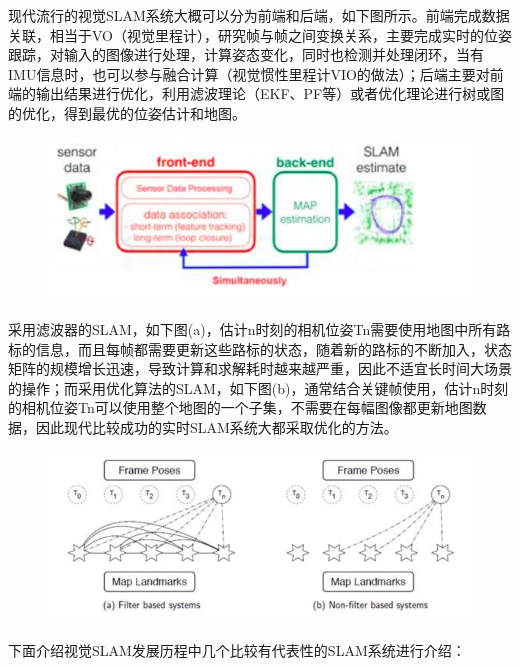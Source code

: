 现代流行的视觉SLAM系统大概可以分为前端和后端，如下图所示。前端完成数据关联，相当于VO（视觉里程计），研究帧与帧之间变换关系，主要完成实时的位姿跟踪，对输入的图像进行处理，计算姿态变化，同时也检测并处理闭环，当有IMU信息时，也可以参与融合计算（视觉惯性里程计VIO的做法）；后端主要对前端的输出结果进行优化，利用滤波理论（EKF、PF等）或者优化理论进行树或图的优化，得到最优的位姿估计和地图。

\begin{figure}[h]%
	\centering  %
	\includegraphics[width=0.7\linewidth]{image/Talk/6.png}  %

\end{figure}

采用滤波器的SLAM，如下图(a)，估计n时刻的相机位姿Tn需要使用地图中所有路标的信息，而且每帧都需要更新这些路标的状态，随着新的路标的不断加入，状态矩阵的规模增长迅速，导致计算和求解耗时越来越严重，因此不适宜长时间大场景的操作；而采用优化算法的SLAM，如下图(b)，通常结合关键帧使用，估计n时刻的相机位姿Tn可以使用整个地图的一个子集，不需要在每幅图像都更新地图数据，因此现代比较成功的实时SLAM系统大都采取优化的方法。
\begin{figure}[h]%
	\centering  %
	\includegraphics[width=0.7\linewidth]{image/Talk/7.png}  %

\end{figure}






下面介绍视觉SLAM发展历程中几个比较有代表性的SLAM系统进行介绍：

